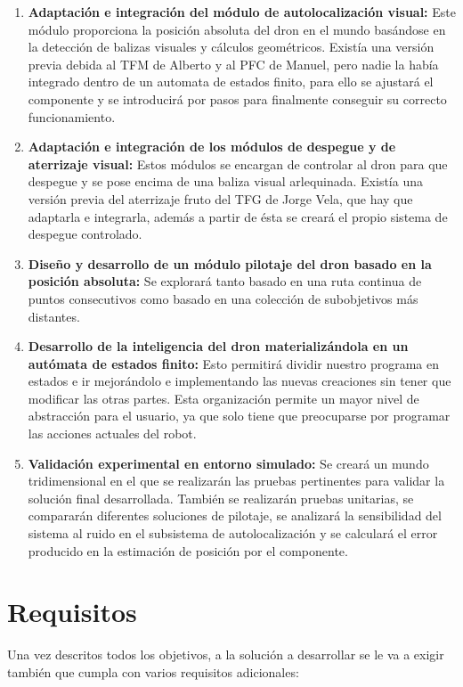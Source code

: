 \begin{enumerate}
	\item{\textbf{Adaptación e integración del módulo de autolocalización visual:} Este módulo proporciona la posición absoluta del dron en el mundo basándose en la detección de balizas visuales y cálculos geométricos. Existía una versión previa debida al TFM de Alberto y al PFC de Manuel, pero nadie la había integrado dentro de un automata de estados finito, para ello se ajustará el componente y se introducirá por pasos para finalmente conseguir su correcto funcionamiento.}
	\item{\textbf{Adaptación e integración de los módulos de despegue y de aterrizaje visual:} Estos módulos se encargan de controlar al dron para que despegue y se pose encima de una baliza visual arlequinada. Existía una versión previa del aterrizaje fruto del TFG de Jorge Vela, que hay que adaptarla e integrarla, además a partir de ésta se creará el propio sistema de despegue controlado.}
	\item{\textbf{Diseño y desarrollo de un módulo pilotaje del dron basado en la posición absoluta:} Se explorará tanto basado en una ruta continua de puntos consecutivos como basado en una colección de subobjetivos más distantes.}
	\item{\textbf{Desarrollo de la inteligencia del dron materializándola en un autómata de estados finito:} Esto permitirá dividir nuestro programa en estados e ir mejorándolo e implementando las nuevas creaciones sin tener que modificar las otras partes. Esta organización permite un mayor nivel de abstracción para el usuario, ya que solo tiene que preocuparse por programar las acciones actuales del robot.}
	\item{\textbf{Validación experimental en entorno simulado:} Se creará un mundo tridimensional en el que se realizarán las pruebas pertinentes para validar la solución final desarrollada. También se realizarán pruebas unitarias, se compararán diferentes soluciones de pilotaje, se analizará la sensibilidad del sistema al ruido en el subsistema de autolocalización y se calculará el error producido en la estimación de posición por el componente.}
\end{enumerate}

\section{Requisitos}
\hspace{1cm} Una vez descritos todos los objetivos, a la solución a desarrollar se le va a exigir también que cumpla con varios requisitos adicionales:

